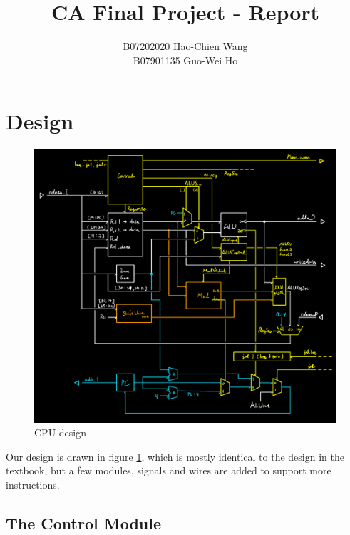 \documentclass[12pt]{article}
\title{CA Final Project - Report}
\author{B07202020 Hao-Chien Wang\\B07901135 Guo-Wei Ho}
\begin{document}
\maketitle

\section{Design}%
\label{sec:design}

\begin{figure}[h!]
	\centering
	\includegraphics[width=\linewidth]{./CA-Final-Project-Design-crop.pdf}
	\caption{CPU design}%
	\label{fig:design}
\end{figure}


Our design is drawn in figure \ref{fig:design}, which is mostly identical to the
design in the textbook, but a few modules, signals and wires are added to support
more instructions. \\

\subsection{The Control Module}%
\label{sub:the_control_module}
\end{document}
